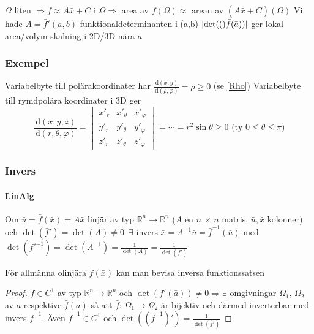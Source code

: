 \documentclass[a4paper]{article}
\DeclarePairedDelimiter \abs{\lvert}{\rvert}
\let\olddet\det
\renewcommand*{\det}[1]{\olddet(#1)}
\begin{document}
$\Omega$ liten $\Rightarrow \bar{f} \approx A\bar{x} + \bar{C}$ i $\Omega \Rightarrow$ area av $\bar{f}(\Omega) \approx$ arean av $(A\bar{x}+\bar{C})(\Omega)$ \newline
Vi hade $A = \bar{f}'(a,b)$ funktionaldeterminanten i (a,b) $\abs{\det{\bar{f}(\bar{a})}}$ ger \underline{lokal} area/volym-skalning i 2D/3D nära $\bar{a}$

\newpage
\subsubsection{Exempel} \label{sec:rymdpol}
Variabelbyte till polärakoordinater har $\frac{\,\mathrm{d}(x,y)}{\,\mathrm{d}(\rho,\varphi)} = \rho \geq 0$ (se \vref{Rho}) \newline
Variabelbyte till rymdpolära koordinater i 3D ger
$$
	\frac{\,\mathrm{d}(x,y,z)}{\,\mathrm{d}(r,\theta,\varphi)} =
	\begin{vmatrix}
		x'_r & x'_\theta & x'_\varphi \\
		y'_r & y'_\theta & y'_\varphi \\
		z'_r & z'_\theta & z'_\varphi
	\end{vmatrix}
	= \cdots = r^2\sin{\theta} \geq 0 \text{  (ty }0 \leq \theta \leq \pi )
$$

\subsubsection{Invers}
\paragraph{LinAlg}
Om $\bar{u} = \bar{f}(\bar{x}) = A\bar{x}$ linjär av typ $\mathbb{R}^n \rightarrow \mathbb{R}^n$ ($A$ en $n \,\times\, n$ matris, $\bar{u},\bar{x}$ kolonner) och $\det{\bar{f}'} = \det{A} \neq 0$
$\, \exists$ invers $\bar{x} = A^{-1}\bar{u} = \bar{f}^{-1}(\bar{u})$ med $\det{\bar{f}'^{-1}} = \det{A^{-1}} = \frac{1}{\det{A}} = \frac{1}{\det{\bar{f}'}}$ \newline

För allmänna olinjära $\bar{f}(\bar{x})$ kan man bevisa inversa funktionssatsen \newline

\begin{proof}$f \in C^1$ av typ $\mathbb{R}^n \rightarrow \mathbb{R}^n$ och $\det{f'(\bar{a})} \neq 0 \Rightarrow \exists$ omgivningar $\Omega_1, \, \Omega_2$ av $\bar{a}$ respektive $\bar{f}(\bar{a})$ så att
$\bar{f}: \, \Omega_1 \rightarrow \Omega_2$ är bijektiv och därmed inverterbar med invers $\bar{f}^{-1}$. Även $\bar{f}^{-1} \in C^1$ och $\det{(\bar{f}^{-1})'} = \frac{1}{\det{\bar{f}'}}$\end{proof}
\end{document}
